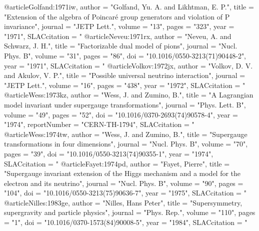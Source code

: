@article{Golfand:1971iw,
      author         = "Golfand, Yu. A. and Likhtman, E. P.",
      title          = "{Extension of the algebra of {P}oincar\'{e} group generators
                        and violation of {P} invariance}",
      journal        = "JETP Lett.",
      volume         = "13",
      pages          = "323",
      year           = "1971",
      SLACcitation   = "%
}
@article{Neveu:1971rx,
      author         = "Neveu, A. and Schwarz, J. H.",
      title          = "{Factorizable dual model of pions}",
      journal        = "Nucl. Phys. B",
      volume         = "31",
      pages          = "86",
      doi            = "10.1016/0550-3213(71)90448-2",
      year           = "1971",
      SLACcitation   = "%
}
@article{Volkov:1972jx,
      author         = "Volkov, D. V. and Akulov, V. P.",
      title          = "{Possible universal neutrino interaction}",
      journal        = "JETP Lett.",
      volume         = "16",
      pages          = "438",
      year           = "1972",
      SLACcitation   = "%
}
@article{Wess:1973kz,
      author         = "Wess, J. and Zumino, B.",
      title          = "{A {L}agrangian model invariant under supergauge
                        transformations}",
      journal        = "Phys. Lett. B",
      volume         = "49",
      pages          = "52",
      doi            = "10.1016/0370-2693(74)90578-4",
      year           = "1974",
      reportNumber   = "CERN-TH-1794",
      SLACcitation   = "%
}
@article{Wess:1974tw,
      author         = "Wess, J. and Zumino, B.",
      title          = "{Supergauge transformations in four dimensions}",
      journal        = "Nucl. Phys. B",
      volume         = "70",
      pages          = "39",
      doi            = "10.1016/0550-3213(74)90355-1",
      year           = "1974",
      SLACcitation   = "%
}
@article{Fayet:1974pd,
      author         = "Fayet, Pierre",
      title          = "{Supergauge invariant extension of the {H}iggs mechanism
                        and a model for the electron and its neutrino}",
      journal        = "Nucl. Phys. B",
      volume         = "90",
      pages          = "104",
      doi            = "10.1016/0550-3213(75)90636-7",
      year           = "1975",
      SLACcitation   = "%
}
@article{Nilles:1983ge,
      author         = "Nilles, Hans Peter",
      title          = "{Supersymmetry, supergravity and particle physics}",
      journal        = "Phys. Rep.",
      volume         = "110",
      pages          = "1",
      doi            = "10.1016/0370-1573(84)90008-5",
      year           = "1984",
      SLACcitation   = "%
}
